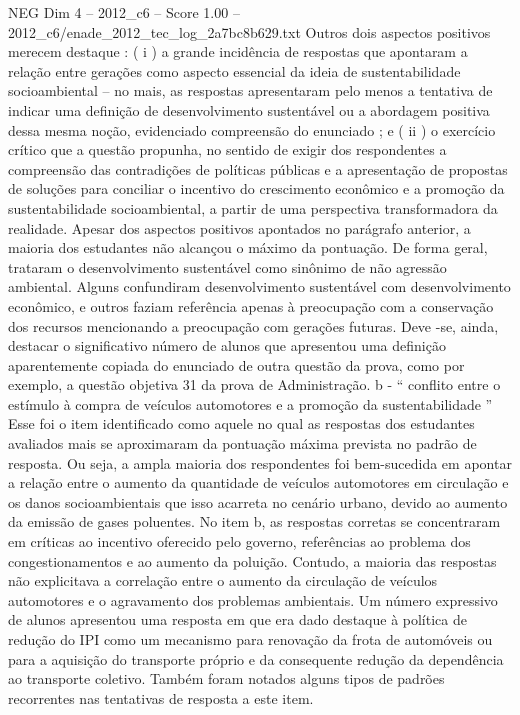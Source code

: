 \begin{textsample}{NEG Dim 4 – 2012\_c6 – Score 1.00 – 2012\_c6/enade\_2012\_tec\_log\_2a7bc8b629.txt}
Outros dois aspectos positivos merecem destaque : ( i ) a grande incidência de respostas que apontaram a relação entre gerações como aspecto essencial da ideia de sustentabilidade socioambiental – no mais, as respostas apresentaram pelo menos a tentativa de indicar uma definição de desenvolvimento sustentável ou a abordagem positiva dessa mesma noção, evidenciado compreensão do enunciado ; e ( ii ) o exercício crítico que a questão propunha, no sentido de exigir dos respondentes a compreensão das contradições de políticas públicas e a apresentação de propostas de soluções para conciliar o incentivo do crescimento econômico e a promoção da sustentabilidade socioambiental, a partir de uma perspectiva transformadora da realidade.
Apesar dos aspectos positivos apontados no parágrafo anterior, a maioria dos estudantes não alcançou o máximo da pontuação.
De forma geral, trataram o desenvolvimento sustentável como sinônimo de não agressão ambiental.
Alguns confundiram desenvolvimento sustentável com desenvolvimento econômico, e outros faziam referência apenas à preocupação com a conservação dos recursos mencionando a preocupação com gerações futuras.
Deve -se, ainda, destacar o significativo número de alunos que apresentou uma definição aparentemente copiada do enunciado de outra questão da prova, como por exemplo, a questão objetiva 31 da prova de Administração. b - “ conflito entre o estímulo à compra de veículos automotores e a promoção da sustentabilidade ” Esse foi o item identificado como aquele no qual as respostas dos estudantes avaliados mais se aproximaram da pontuação máxima prevista no padrão de resposta.
Ou seja, a ampla maioria dos respondentes foi bem-sucedida em apontar a relação entre o aumento da quantidade de veículos automotores em circulação e os danos socioambientais que isso acarreta no cenário urbano, devido ao aumento da emissão de gases poluentes.
No item b, as respostas corretas se concentraram em críticas ao incentivo oferecido pelo governo, referências ao problema dos congestionamentos e ao aumento da poluição.
Contudo, a maioria das respostas não explicitava a correlação entre o aumento da circulação de veículos automotores e o agravamento dos problemas ambientais.
Um número expressivo de alunos apresentou uma resposta em que era dado destaque à política de redução do IPI como um mecanismo para renovação da frota de automóveis ou para a aquisição do transporte próprio e da consequente redução da dependência ao transporte coletivo.
Também foram notados alguns tipos de padrões recorrentes nas tentativas de resposta a este item.

\end{textsample}
